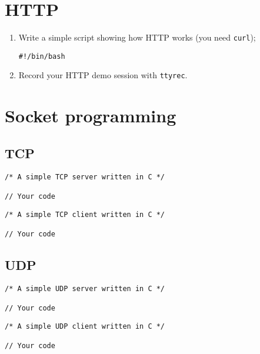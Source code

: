 \documentclass{swfulabreport}
\begin{document}
\section{HTTP}
\label{sec:org060c569}
\begin{enumerate}
\item Write a simple script showing how HTTP works (you need \texttt{curl});
\begin{verbatim}
#!/bin/bash

\end{verbatim}

\item Record your HTTP demo session with \texttt{ttyrec}.
\end{enumerate}

\section{Socket programming}
\label{sec:org2570ebe}

\subsection{TCP}
\label{sec:orgaf956c8}

\begin{verbatim}
/* A simple TCP server written in C */

// Your code
\end{verbatim}

\begin{verbatim}
/* A simple TCP client written in C */

// Your code
\end{verbatim}

\subsection{UDP}
\label{sec:orgeab4237}

\begin{verbatim}
/* A simple UDP server written in C */

// Your code
\end{verbatim}

\begin{verbatim}
/* A simple UDP client written in C */

// Your code
\end{verbatim}
\end{document}
